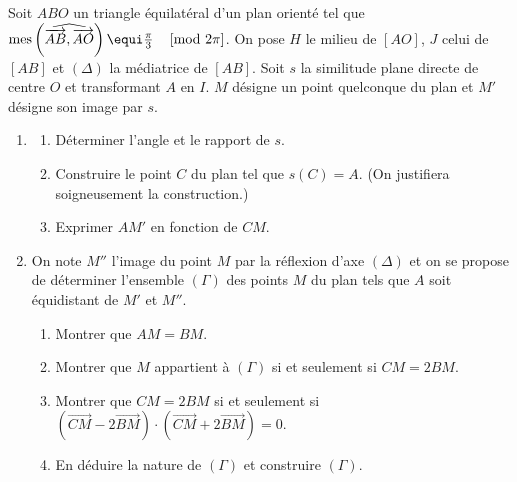 \begin{exo} %
      Soit $ABO$ un triangle \'equilat\'eral d'un plan orient\'e tel que $\congru{\mes{AB}{AO}}{\frac{\pi}{3}}{2\pi}$.
      On pose $H$ le milieu de $[AO]$, $J$ celui de $[AB]$ et $(\Delta)$ la m\'ediatrice de $[AB]$.
      Soit $s$ la similitude plane directe de centre $O$ et transformant $A$ en $I$.
      $M$ d\'esigne un point quelconque du plan et $M'$ d\'esigne son image par $s$.
      \begin{enumerate}
            \item \begin{enumerate}
                        \item D\'eterminer l'angle et le rapport de $s$.
                        \item Construire le point $C$ du plan tel que $s(C) = A$.
                              (On justifiera soigneusement la construction.)
                        \item Exprimer $AM'$ en fonction de $CM$.
                  \end{enumerate}
            \item On note $M''$ l'image du point $M$ par la r\'eflexion d'axe $(\Delta)$ et on se propose
                  de d\'eterminer l'ensemble $(\Gamma)$ des points $M$ du plan tels que $A$ 
                  soit \'equidistant de $M'$ et $M''$.
                  \begin{enumerate}
                        \item Montrer que $AM = BM$.
                        \item Montrer que $M$ appartient \`a $(\Gamma)$ si et seulement si $CM = 2 BM$.
                        \item Montrer que $CM = 2 BM$ si et seulement si 
                              $(\overrightarrow{CM}-2\overrightarrow{BM})\cdot(\overrightarrow{CM}+2\overrightarrow{BM})=0$.
                        \item En d\'eduire la nature de $(\Gamma)$ et construire $(\Gamma)$.
                  \end{enumerate}
      \end{enumerate}
\end{exo}
%
